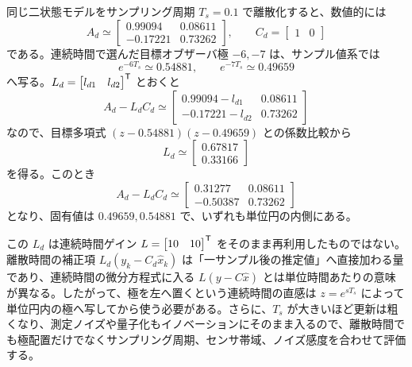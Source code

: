 同じ二状態モデルをサンプリング周期 $T_s=0.1$ で離散化すると、数値的には
\begin{equation}
  A_d\simeq
  \begin{bmatrix}
    0.99094&0.08611\\
    -0.17221&0.73262
  \end{bmatrix},
  \qquad
  C_d=\begin{bmatrix}1&0\end{bmatrix}
\end{equation}
である。連続時間で選んだ目標オブザーバ極 $-6,-7$ は、サンプル値系では
\begin{equation}
  e^{-6T_s}\simeq0.54881,\qquad e^{-7T_s}\simeq0.49659
\end{equation}
へ写る。$L_d=\begin{bmatrix}l_{d1}&l_{d2}\end{bmatrix}^{\mathsf{T}}$ とおくと
\begin{equation}
  A_d-L_d C_d\simeq
  \begin{bmatrix}
    0.99094-l_{d1}&0.08611\\
    -0.17221-l_{d2}&0.73262
  \end{bmatrix}
\end{equation}
なので、目標多項式 $(z-0.54881)(z-0.49659)$ との係数比較から
\begin{equation}
  L_d\simeq
  \begin{bmatrix}0.67817\\0.33166\end{bmatrix}
\end{equation}
を得る。このとき
\begin{equation}
  A_d-L_d C_d\simeq
  \begin{bmatrix}
    0.31277&0.08611\\
    -0.50387&0.73262
  \end{bmatrix}
\end{equation}
となり、固有値は $0.49659,0.54881$ で、いずれも単位円の内側にある。

この $L_d$ は連続時間ゲイン $L=\begin{bmatrix}10&10\end{bmatrix}^{\mathsf{T}}$ をそのまま再利用したものではない。離散時間の補正項 $L_d(y_k-C_d\hat{x}_k)$ は「一サンプル後の推定値」へ直接加わる量であり、連続時間の微分方程式に入る $L(y-C\hat{x})$ とは単位時間あたりの意味が異なる。したがって、極を左へ置くという連続時間の直感は $z=e^{sT_s}$ によって単位円内の極へ写してから使う必要がある。さらに、$T_s$ が大きいほど更新は粗くなり、測定ノイズや量子化もイノベーションにそのまま入るので、離散時間でも極配置だけでなくサンプリング周期、センサ帯域、ノイズ感度を合わせて評価する。

